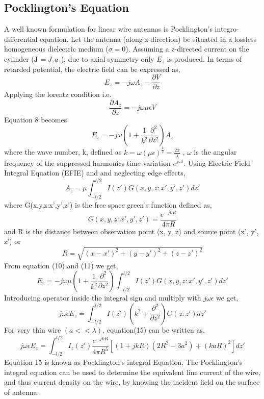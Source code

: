 \documentclass[aps,prstab,twocolumn,superscriptaddress,groupedaddress,showkeys,nofootinbib]{revtex4}  %
\begin{document}
\subsection{Pocklington's Equation}
A well known formulation for linear wire antennas is Pocklington's integro-differential equation. Let the antenna (along z-direction) be situated in a lossless homogeneous dielectric medium ($\sigma=0$). Assuming a z-directed current on the cylinder ($\textbf{J}=J_{z}a_{z}$), due to axial symmetry only $E_{z}$ is produced. In terms of retarded potential, the electric field can be expressed as,
\begin{equation}
E_{z}=-j \omega A_{z}-\frac{\partial V}{\partial z}
\end{equation}
Applying the lorentz condition i.e.
\begin{equation}
\frac{\partial A_{z}}{\partial z}=-j \omega \mu \epsilon V
\end{equation}
Equation 8 becomes
\begin{equation}
E_{z}=-j \omega \left (1+\frac{1}{k^{2}}\frac{\partial^2 }{\partial z^2} \right )A_{z}
\end{equation}
where the wave number, k, defined as $ k=\omega (\mu \epsilon )^{\frac{1}{2}}=\frac{2\pi }{\lambda }$ , $\omega$ is the angular frequency of the suppressed harmonics time variation $e^{j\omega t}$. Using Electric Field Integral Equation (EFIE) and and neglecting edge effects, 
\begin{equation}
A_{z}=\mu \int_{-l/2}^{l/2}I(z')G(x,y,z:x',y',z')dz'
\end{equation}
where G(x,y,z:x',y',z') is the free space green's function defined as,
\begin{equation}
G(x,y,z:x',y',z')=\frac{e^{-jkR}}{4 \pi R}
\end{equation}
and R is the distance between observation point (x, y, z) and source point (x', y', z') or 
\begin{equation}
R=\sqrt{(x-x')^{2}+(y-y')^{2}+(z-z')^{2}}
\end{equation}
From equation (10) and (11) we get,
\begin{equation}
E_{z}=-j \omega \mu \left (1+\frac{1}{k^{2}}\frac{\partial^2 }{\partial z^2} \right ) \int_{-l/2}^{l/2}I(z')G(x,y,z:x',y',z')dz'
\end{equation}
Introducing operator inside the integral sign and multiply with $j\omega \epsilon $ we get,
\begin{equation}
j \omega \epsilon E_{z}= \int_{-l/2}^{l/2}I(z')\left (k^{2}+\frac{\partial^2 }{\partial z^2} \right )G(z:z')dz'
\end{equation}
For very thin wire $ (a<< \lambda) $, equation(15) can be written as,
\begin{equation}
j \omega \epsilon E_{z}= \int_{-l/2}^{l/2}I_{z}(z')\frac{e^{-jkR}}{4 \pi R^{5}}\left [ (1+jkR)(2R^2-3a^2)+(kaR)^2 \right ]dz'
\end{equation}
Equation 15 is known as Pocklington's integral Equation. The Pocklington's integral equation can be used to determine the equivalent line current of the wire, and thus current density on the wire, by knowing the incident field on the surface of antenna.
\end{document}
